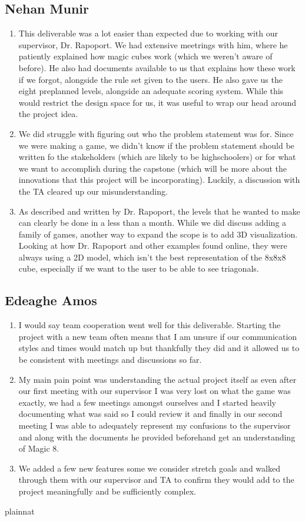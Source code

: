 \documentclass{article}
\begin{document}
\subsection*{Nehan Munir}

\begin{enumerate}
    \item This deliverable was a lot easier than expected due to working with our supervisor, Dr. Rapoport. We had extensive meetrings with him, where he patiently explained how magic cubes work (which we weren't aware of before). He also had documents available to us that explains how these work if we forgot, alongside the rule set given to the users. He also gave us the eight preplanned levels, alongside an adequate scoring system. While this would restrict the design space for us, it was useful to wrap our head around the project idea.
    \item We did struggle with figuring out who the problem statement was for. Since we were making a game, we didn't know if the problem statement should be written fo the stakeholders (which are likely to be highschoolers) or for what we want to accomplish during the capstone (which will be more about the innovations that this project will be incorporating). Luckily, a discussion with the TA cleared up our misunderstanding.
    \item As described and written by Dr. Rapoport, the levels that he wanted to make can clearly be done in a less than a month. While we did discuss adding a family of games, another way to expand the scope is to add 3D visualization. Looking at how Dr. Rapoport and other examples found online, they were always using a 2D model, which isn't the best representation of the 8x8x8 cube, especially if we want to the user to be able to see triagonals. 
\end{enumerate}  

\subsection*{Edeaghe Amos}

\begin{enumerate} 
    \item I would say team cooperation went well for this deliverable. Starting the project with a new team often means that I am unsure if our communication styles and times would match up but thankfully they did and it allowed us to be consistent with meetings and discussions so far. 
    \item My main pain point was understanding the actual project itself as even after our first meeting with our supervisor I was very lost on what the game was exactly, we had a few meetings amongst ourselves and I started heavily documenting what was said so I could review it and finally in our second meeting I was able to adequately represent my confusions to the supervisor and along with the documents he provided beforehand get an understanding of Magic 8. 
    \item We added a few new features some we consider stretch goals and walked through them with our supervisor and TA to confirm they would add to the project meaningfully and be sufficiently complex. 
\end{enumerate}

 {plainnat}

\end{document}
